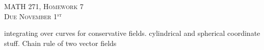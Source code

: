 \documentclass[12pt]{article} %
\begin{document}
\begin{center}
   \textsc{\large MATH 271, Homework 7}\\
   \textsc{Due November 1$^\textrm{st}$}
\end{center}
\vspace{.5cm}

integrating over curves for conservative fields.  cylindrical and spherical coordinate stuff. Chain rule of two vector fields
\end{document}
